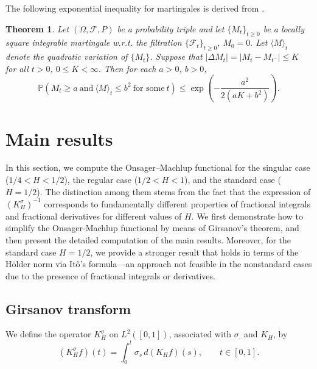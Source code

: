 \documentclass[preprint,12pt]{elsarticle}
\newtheorem{theorem}{Theorem}[section]
\theoremstyle{definition}  %
\theoremstyle{plain}  %
\begin{document}
    



	

    






     The following exponential inequality for martingales is derived from \cite[Lemma 2.1]{inequality}.
   \begin{theorem}	Let $(\Omega,\mathcal{F},P)$ be a probability triple and let $\{M_t\}_{t\geq 0}$ be a locally square integrable martingale w.r.t. the filtration 
  $ \{\mathcal{F}_t\}_{t\geq 0}$, $M_0=0.$ 
  Let \( \langle M\rangle _t \) denote the quadratic variation of \( \{M_t\} \).  Suppose that $|\Delta M_t|=|M_t-M_{t^-} |\leq K$ for all $t>0$, $0\leq K<\infty.$
  Then for each $a>0$, $b>0$,
  \begin{equation*}
  	\mathbb{P}(M_t\geq a \ \text{and}\  \langle M\rangle _t \leq b^2 \ \text{for some}\  t)
  	\leq \exp\left(-\frac{a^2}{2(aK+b^2)}\right).
  \end{equation*}\label{exponential ineq}
   \end{theorem}

\section{Main results}\label{main results}
In this section, we compute the Onsager–Machlup functional for the singular case ($1/4 < H < 1/2$), the regular case ($1/2 < H < 1$), and the standard case ($H = 1/2$).
The distinction among them stems from the fact that the expression of $(K_H^\sigma)^{-1}$ corresponds to fundamentally different properties of fractional integrals and fractional derivatives for different values of $H$.
We first demonstrate how to simplify the Onsager-Machlup functional by means of Girsanov’s theorem, and then present the detailed computation of the main results.
Moreover, for the standard case $H = 1/2$, we provide a stronger result that holds in terms of the H\"older norm via It\^o’s formula—an approach not feasible in the nonstandard cases due to the presence of fractional integrals or derivatives.

\subsection{ Girsanov transform}
We define the operator $K_H^\sigma$ on $L^2([0,1])$, associated with $\sigma_\cdot$ and $K_H$, by  
\begin{equation}
   (K_H^\sigma f)(t) = \int_0^t \sigma_s \, d(K_H f)(s), 
   \qquad t \in [0,1].
\end{equation}
\end{document}
